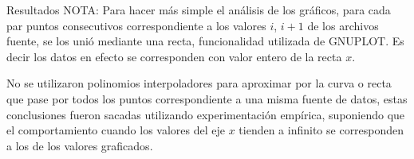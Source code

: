 \begin{section}{Resultados}
	NOTA: 
	Para hacer más simple el análisis de los gráficos, para cada par puntos consecutivos correspondiente a los valores $i$, $i+1$ de los archivos fuente, se los unió mediante una recta, funcionalidad utilizada de GNUPLOT. Es decir los datos en efecto se corresponden con valor entero de la recta $x$.
	
	No se utilizaron polinomios interpoladores para aproximar por la curva o recta que pase por todos los puntos correspondiente a una misma fuente de datos, estas conclusiones fueron sacadas utilizando experimentación empírica, suponiendo que el comportamiento cuando los valores del eje $x$ tienden a infinito se corresponden a los de los valores graficados.

\end{section}
